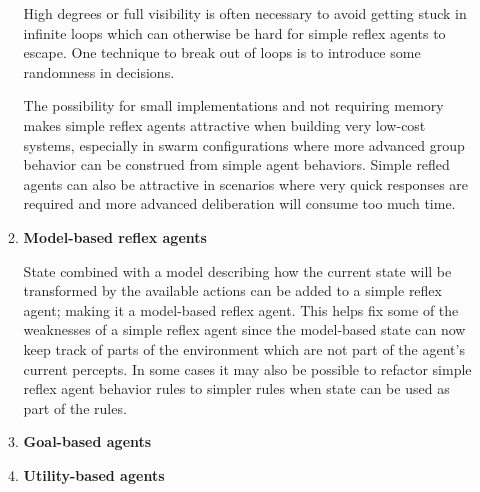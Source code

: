 \begin{enumerate}
\begin{enumerate}
High degrees or full visibility is often necessary to avoid getting stuck in infinite loops which can otherwise be hard for simple reflex agents to escape. One technique to break out of loops is to introduce some randomness in decisions.

The possibility for small implementations and not requiring memory makes simple reflex agents attractive when building very low-cost systems, especially in swarm configurations where more advanced group behavior can be construed from simple agent behaviors. Simple refled agents can also be attractive in scenarios where very quick responses are required and more advanced deliberation will consume too much time.

\item \textbf{Model-based reflex agents}

State combined with a model describing how the current state will be transformed by the available actions can be added to a simple reflex agent; making it a model-based reflex agent. This helps fix some of the weaknesses of a simple reflex agent since the model-based state can now keep track of parts of the environment which are not part of the agent's current percepts. In some cases it may also be possible to refactor simple reflex agent behavior rules to simpler rules when state can be used as part of the rules.

\item \textbf{Goal-based agents}

\item \textbf{Utility-based agents}

\end{enumerate}

\end{enumerate}



